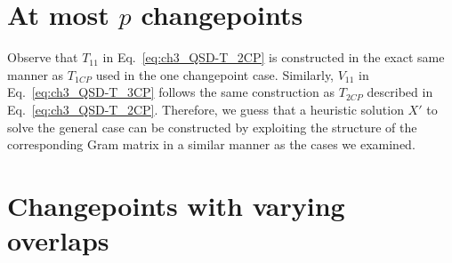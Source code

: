 \begin{appendices}

\section{At most $p$ changepoints}

Observe that $T_{11}$ in Eq.~\eqref{eq:ch3_QSD-T_2CP} is constructed in the exact same manner as $T_{1CP}$ used in the one changepoint case.
Similarly, $V_{11}$ in Eq.~\eqref{eq:ch3_QSD-T_3CP} follows the same construction as $T_{2CP}$ described in Eq.~\eqref{eq:ch3_QSD-T_2CP}.
Therefore, we guess that a heuristic solution $X'$ to solve the general case can be constructed by exploiting the structure of the corresponding Gram matrix in a similar manner as the cases we examined.


\section{Changepoints with varying overlaps}\label{sec:ch3_QSD-theta_expts}


\end{appendices}
